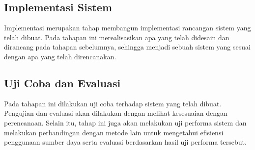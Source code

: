 \subsection{Implementasi Sistem}
Implementasi merupakan tahap membangun implementasi rancangan sistem yang telah dibuat. Pada tahapan ini merealisasikan apa yang telah didesain dan dirancang pada tahapan sebelumnya, sehingga menjadi sebuah sistem yang sesuai dengan apa yang telah direncanakan.
\subsection{Uji Coba dan Evaluasi}
Pada tahapan ini dilakukan uji coba terhadap sistem yang telah dibuat. Pengujian dan evaluasi akan dilakukan dengan melihat kesesuaian dengan perencanaan. Selain itu, tahap ini juga akan melakukan uji performa sistem dan melakukan perbandingan dengan metode lain untuk mengetahui efisiensi penggunaan sumber daya serta evaluasi berdasarkan hasil uji performa tersebut. 

